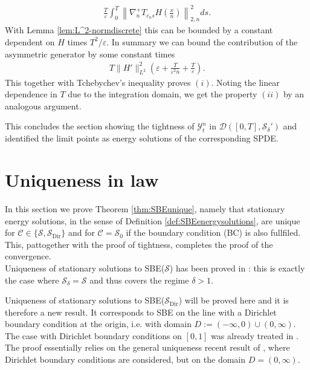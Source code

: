 \documentclass[a4paper, reqno, 12pt]{amsart}
\theoremstyle{plain}
\theoremstyle{definition}
\newcommand{\Sdir}{\mathcal{S}_{\text{Dir}}}
\begin{document}
\begin{align} \label{eq:tightnonlinear}
    \frac{T}{\varepsilon} \int_0^T \left\| \nabla_n^+ T_{c_ns}H\left(\frac{x}{n}\right)\right\|^2_{2,n}ds.
\end{align}
With Lemma \ref{lem:L^2-normdiscrete} this can be bounded by a constant dependent on $H$ times $T^2/\varepsilon$.
In summary we can bound the contribution of the asymmetric generator by some constant times
\begin{align*}
    T\|H'\|_{L^2}^2 \left( \varepsilon + \frac{T}{\varepsilon^2n}  +\frac{T}{\varepsilon}\right).
\end{align*}
This together with  Tchebychev's inequality proves $(i)$. Noting the linear dependence in $T$ due to the integration domain, we get the property $(ii)$ by an analogous argument.

This concludes the section showing the tightness of $\mathcal{Y}^n_t$ in $\mathcal{D}([0,T],\mathcal{S}_{\delta}')$ and identified the limit points as energy solutions of the corresponding SPDE.



\section{Uniqueness  in law}
 \label{sec:uniqueness} 


In this section we prove Theorem \ref{thm:SBEunique}, namely that stationary energy solutions, in the sense of Definition \ref{def:SBEenergysolutions}, are unique for $\mathcal C \in \{\mathcal S, \Sdir\}$ and for $\mathcal C=\mathcal S_0$ if the boundary condition (BC) is  also fullfiled. This, pat{together with the proof of tightness,}  completes the proof of the convergence. \\
 
Uniqueness of stationary solutions to SBE($\mathcal S$) has been proved in \cite{GP18}: this is exactly the case where $\mathcal S_{\delta} = \mathcal S$ and thus covers the regime $\delta >1$. 

Uniqueness of stationary solutions to SBE($\Sdir$) will be proved here and it is therefore a new result. It corresponds to SBE on the line with a Dirichlet boundary condition at the origin, i.e. with domain $D:= (-\infty,0)\cup (0,\infty)$. The case with Dirichlet boundary conditions on $[0,1]$ was already treated in \cite{GPS20}.  The proof essentially relies on the general uniqueness recent result of \cite{GPP24}, where Dirichlet boundary conditions are considered, but on the domain $D=(0,\infty)$. 
\end{document}
